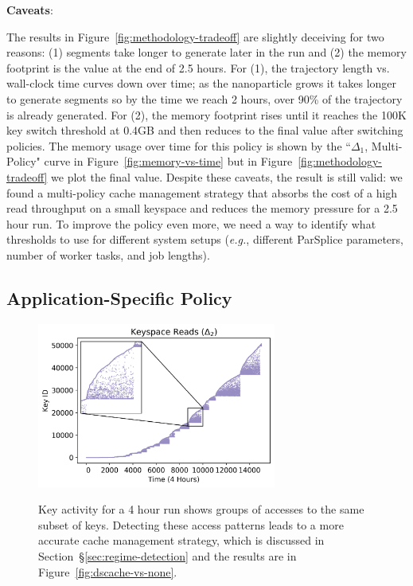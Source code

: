 \textbf{Caveats}: 

The results in Figure~\ref{fig:methodology-tradeoff} are slightly deceiving for
two reasons: (1) segments take longer to generate later in the run and (2) the
memory footprint is the value at the end of 2.5 hours.  For (1), the trajectory
length vs.  wall-clock time curves down over time; as the nanoparticle grows it
takes longer to generate segments so by the time we reach 2 hours, over 90\% of
the trajectory is already generated.  For (2), the memory footprint rises until
it reaches the 100K key switch threshold at 0.4GB and then reduces to the final
value after switching policies. The memory usage over time for this policy is
shown by the ``\(\Delta_1\), Multi-Policy" curve in
Figure~\ref{fig:memory-vs-time} but in Figure~\ref{fig:methodology-tradeoff} we
plot the final value.  Despite these caveats, the result is still valid: we
found a multi-policy cache management strategy that absorbs the cost of a high
read throughput on a small keyspace and reduces the memory pressure for a 2.5
hour run.  To improve the policy even more, we need a way to identify what
thresholds to use for different system setups ({\it e.g.}, different ParSplice
parameters, number of worker tasks, and job lengths).  

\subsection{Application-Specific Policy}
\label{sec:dom-specific}

\begin{figure}[tb]
  \centering
  \includegraphics[width=0.7\textwidth]{./chapters/controlplane/parsplice/figures/keyspace-zoomed.png}\\
  \caption{Key activity for a 4 hour run shows groups of accesses to the same
  subset of keys. Detecting these access patterns leads to a more accurate cache
  management strategy, which is discussed in Section~\S\ref{sec:regime-detection}
  and the results are in Figure~\ref{fig:dscache-vs-none}.}
  \label{fig:keyspace-zoomed}
\end{figure}

